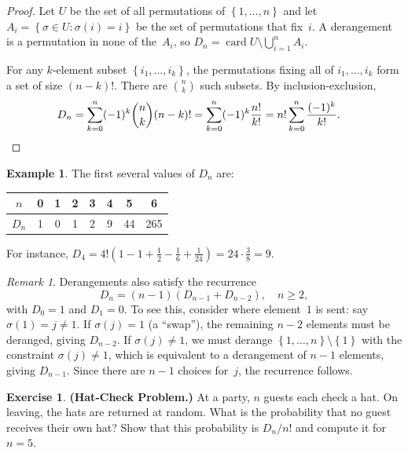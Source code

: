 \documentclass[12pt,a4paper,openany]{book}
\theoremstyle{definition}
\newtheorem{example}[definition]{Example}
\newtheorem{exercise}{Exercise}[chapter]
\theoremstyle{plain}
\theoremstyle{remark}
\newtheorem{remark}[definition]{Remark}
\newcommand{\set}[1]{\left\{#1\right\}}
\DeclareMathOperator{\card}{card}
\begin{document}
\begin{proof}
Let $U$ be the set of all permutations of $\set{1,\dots,n}$ and let
$A_i = \set{\sigma \in U : \sigma(i) = i}$ be the set of permutations
that fix~$i$.  A derangement is a permutation in none of the~$A_i$, so
$D_n = \card{U \setminus \bigcup_{i=1}^n A_i}$.

For any $k$-element subset $\set{i_1,\dots,i_k}$, the permutations
fixing all of $i_1, \dots, i_k$ form a set of size $(n-k)!$.
There are $\binom{n}{k}$ such subsets.  By inclusion-exclusion,
\begin{align*}
  D_n &= \sum_{k=0}^{n}(-1)^k \binom{n}{k}(n-k)!
       = \sum_{k=0}^{n}(-1)^k \frac{n!}{k!}
       = n!\sum_{k=0}^{n}\frac{(-1)^k}{k!}. \qedhere
\end{align*}
\end{proof}

\begin{example}\label{ex:derangement-small}
The first several values of $D_n$ are:
\begin{center}
\begin{tabular}{c|ccccccc}
  $n$   & 0 & 1 & 2 & 3 & 4  & 5  & 6 \\ \hline
  $D_n$ & 1 & 0 & 1 & 2 & 9  & 44 & 265
\end{tabular}
\end{center}
For instance, $D_4 = 4!(1 - 1 + \tfrac{1}{2} - \tfrac{1}{6} +
\tfrac{1}{24}) = 24 \cdot \tfrac{3}{8} = 9$.
\end{example}

\begin{remark}\label{rem:derangement-recursive}
Derangements also satisfy the recurrence
\[
  D_n = (n-1)(D_{n-1} + D_{n-2}), \quad n \ge 2,
\]
with $D_0 = 1$ and $D_1 = 0$.  To see this, consider where element~$1$
is sent: say $\sigma(1) = j \neq 1$.  If $\sigma(j) = 1$ (a
``swap''), the remaining $n-2$ elements must be deranged, giving
$D_{n-2}$.  If $\sigma(j) \neq 1$, we must derange $\set{1,\dots,n}
\setminus\set{1}$ with the constraint $\sigma(j)\neq 1$, which is
equivalent to a derangement of $n-1$ elements, giving $D_{n-1}$.
Since there are $n-1$ choices for~$j$, the recurrence follows.
\end{remark}

\begin{exercise}\label{exo:hat-check}
\textbf{(Hat-Check Problem.)}
At a party, $n$ guests each check a hat.  On leaving, the hats are
returned at random.  What is the probability that no guest receives
their own hat?  Show that this probability is $D_n / n!$ and compute
it for $n = 5$.
\end{exercise}
\end{document}
